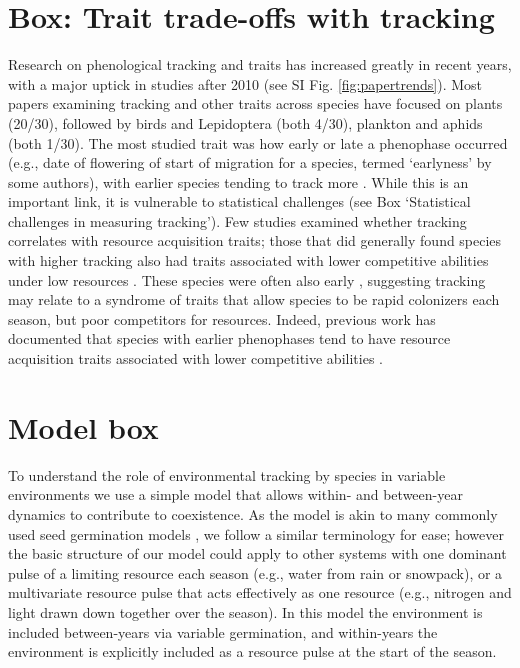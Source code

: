 \documentclass[11pt,letterpaper]{article}
\begin{document}
\section{Box: Trait trade-offs with tracking}
Research on phenological tracking and traits has increased greatly in recent years, with a major uptick in studies after 2010 (see SI Fig. \ref{fig:papertrends}). Most papers examining tracking and other traits across species have focused on plants (20/30), followed by birds and Lepidoptera (both 4/30), plankton and aphids (both 1/30). The most studied trait was how early or late a phenophase occurred (e.g., date of flowering of start of migration for a species, termed `earlyness' by some authors), with earlier species tending to track more \citep[studies included both birds and Lepidotera,][]{Diamond:2011nx,Ishioka2013,kharouba2014,jing2016,du2017}. While this is an important link, it is vulnerable to statistical challenges (see Box `Statistical challenges in measuring tracking'). Few studies examined whether tracking correlates with resource acquisition traits; those that did generally found species with higher tracking also had traits associated with lower competitive abilities under low resources \citep[e.g., being shallower or lacking a taproot rooted][]{Dorji2013,lasky2016,Zhu2016BioLetters}. These species were often also early \citep[e.g.,][]{Dorji2013,Zhu2016BioLetters}, suggesting tracking may relate to a syndrome of traits that allow species to be rapid colonizers each season, but poor competitors for resources. Indeed, previous work has documented that species with earlier phenophases tend to have resource acquisition traits associated with lower competitive abilities \citep[e.g., they tend to be of lower height, have shallower roots, narrower diameter vessels, thinner leaves, and grow faster, reviewed in][]{wolkovich2014aob}. 


\section{Model box} %
To understand the role of environmental tracking by species in variable environments we use a simple model that allows within- and between-year dynamics to contribute to coexistence. As the model is akin to many commonly used seed germination models \citep{Chesson:2004eo}, we follow a similar terminology for ease; however the basic structure of our model could apply to other systems with one dominant pulse of a limiting resource each season (e.g., water from rain or snowpack), or a multivariate resource pulse that acts effectively as one resource (e.g., nitrogen and light drawn down together over the season). In this model the environment is included between-years via variable germination, and within-years the environment is explicitly included as a resource pulse at the start of the season. 
\end{document}
